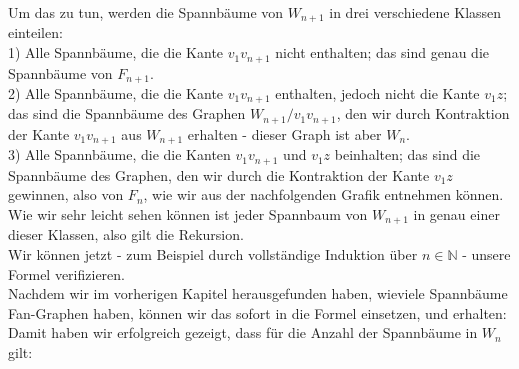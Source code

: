 Um das zu tun, werden die Spannbäume von $W_{n+1}$ in drei verschiedene Klassen einteilen:\\%
1) Alle Spannbäume, die die Kante $v_1v_{n+1}$ nicht enthalten; das sind genau die Spannbäume von $F_{n+1}$.\\
2) Alle Spannbäume, die die Kante $v_1v_{n+1}$ enthalten, jedoch nicht die Kante $v_1z$; das sind die Spannbäume des Graphen $W_{n+1} \slash v_1v_{n+1}$, den wir durch Kontraktion der Kante $v_1v_{n+1}$ aus $W_{n+1}$ erhalten - dieser Graph ist aber $W_n$.\\
3) Alle Spannbäume, die die Kanten $v_1v_{n+1}$ und $v_1z$ beinhalten; das sind die Spannbäume des Graphen, den wir durch die Kontraktion der Kante $v_1z$ gewinnen, also von $F_n$, wie wir aus der nachfolgenden Grafik entnehmen können.\\
Wie wir sehr leicht sehen können ist jeder Spannbaum von $W_{n+1}$ in genau einer dieser Klassen, also gilt die Rekursion.\\
Wir können jetzt - zum Beispiel durch vollständige Induktion über $n \in \mathbb{N}$ - unsere Formel %
verifizieren.\\
Nachdem wir im vorherigen Kapitel herausgefunden haben, wieviele Spannbäume Fan-Graphen haben, können wir das sofort in die Formel einsetzen, und erhalten:\\
Damit haben wir erfolgreich gezeigt, dass für die Anzahl der Spannbäume in $W_n$ gilt:\\

